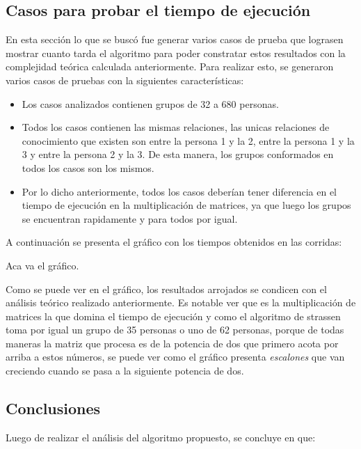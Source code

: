 \documentclass[a4paper, 12pt]{article}
\begin{document}
\subsection*{Casos para probar el tiempo de ejecuci\'on}

En esta secci\'on lo que se busc\'o fue generar varios casos de prueba que lograsen mostrar cuanto tarda el algoritmo para poder constratar estos resultados con la complejidad te\'orica calculada anteriormente. Para realizar esto, se generaron varios casos de pruebas con la siguientes caracter\'isticas:

\begin{itemize}
\item Los casos analizados contienen grupos de 32 a 680 personas.
\item Todos los casos contienen las mismas relaciones, las unicas relaciones de conocimiento que existen son entre la persona 1 y la 2, entre la persona 1 y la 3 y entre la persona 2 y la 3. De esta manera, los grupos conformados en todos los casos son los mismos.
\item Por lo dicho anteriormente, todos los casos deber\'ian tener diferencia en el tiempo de ejecuci\'on en la multiplicaci\'on de matrices, ya que luego los grupos se encuentran rapidamente y para todos por igual.
\end{itemize}
A continuaci\'on se presenta el gr\'afico con los tiempos obtenidos en las corridas:

Aca va el gr\'afico.


Como se puede ver en el gr\'afico, los resultados arrojados se condicen con el an\'alisis te\'orico realizado anteriormente. Es notable ver que es la multiplicaci\'on de matrices la que domina el tiempo de ejecuci\'on y como el algoritmo de strassen toma por igual un grupo de 35 personas o uno de 62 personas, porque de todas maneras la matriz que procesa es de la potencia de dos que primero acota por arriba a estos n\'umeros, se puede ver como el gr\'afico presenta \emph{escalones} que van creciendo cuando se pasa a la siguiente potencia de dos.


\subsection*{Conclusiones}
Luego de realizar el an\'alisis del algoritmo propuesto, se concluye en que:
\end{document}
